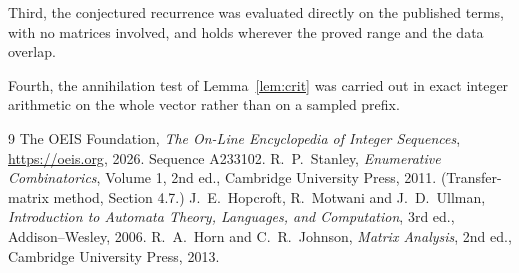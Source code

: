 \documentclass[11pt,a4paper]{article}
\theoremstyle{plain}
\theoremstyle{definition}
\begin{document}
Third, the conjectured recurrence was evaluated directly on the published terms, with no
matrices involved, and holds wherever the proved range and the data overlap.

Fourth, the annihilation test of Lemma~\ref{lem:crit} was carried out in exact integer
arithmetic on the whole vector rather than on a sampled prefix.

\begin{thebibliography}{9}
 The OEIS Foundation, \emph{The On-Line Encyclopedia of Integer
Sequences}, \url{https://oeis.org}, 2026. Sequence A233102.
 R.~P.~Stanley, \emph{Enumerative Combinatorics}, Volume 1, 2nd ed.,
Cambridge University Press, 2011. (Transfer-matrix method, Section 4.7.)
 J.~E.~Hopcroft, R.~Motwani and J.~D.~Ullman, \emph{Introduction to
Automata Theory, Languages, and Computation}, 3rd ed., Addison--Wesley, 2006.
 R.~A.~Horn and C.~R.~Johnson, \emph{Matrix Analysis}, 2nd ed., Cambridge
University Press, 2013.
\end{thebibliography}
\end{document}
